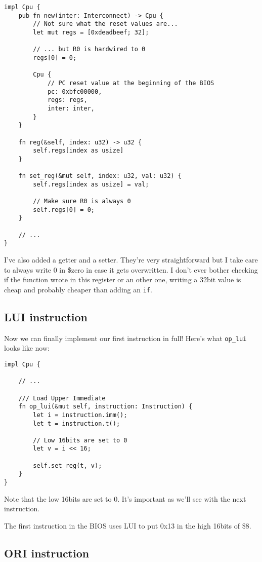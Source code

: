 \documentclass[a4paper]{article}
\newcommand{\code}[1] {\texttt{#1}}
\begin{document}
\begin{lstlisting}
impl Cpu {
    pub fn new(inter: Interconnect) -> Cpu {
        // Not sure what the reset values are...
        let mut regs = [0xdeadbeef; 32];

        // ... but R0 is hardwired to 0
        regs[0] = 0;

        Cpu {
            // PC reset value at the beginning of the BIOS
            pc: 0xbfc00000,
            regs: regs,
            inter: inter,
        }
    }

    fn reg(&self, index: u32) -> u32 {
        self.regs[index as usize]
    }

    fn set_reg(&mut self, index: u32, val: u32) {
        self.regs[index as usize] = val;

        // Make sure R0 is always 0
        self.regs[0] = 0;
    }

    // ...
}
\end{lstlisting}

I've also added a getter and a setter. They're very straightforward
but I take care to always write 0 in \$zero in case it gets
overwritten. I don't ever bother checking if the function wrote in
this register or an other one, writing a 32bit value is cheap and
probably cheaper than adding an \code{if}.

\subsection{LUI instruction}

Now we can finally implement our first instruction in full! Here's
what \code{op\_lui} looks like now:

\begin{lstlisting}
impl Cpu {

    // ...

    /// Load Upper Immediate
    fn op_lui(&mut self, instruction: Instruction) {
        let i = instruction.imm();
        let t = instruction.t();

        // Low 16bits are set to 0
        let v = i << 16;

        self.set_reg(t, v);
    }
}
\end{lstlisting}

Note that the low 16bits are set to 0. It's important as we'll see
with the next instruction.

The first instruction in the BIOS uses LUI to put 0x13 in the high
16bits of \$8.

\subsection{ORI instruction}
\end{document}

